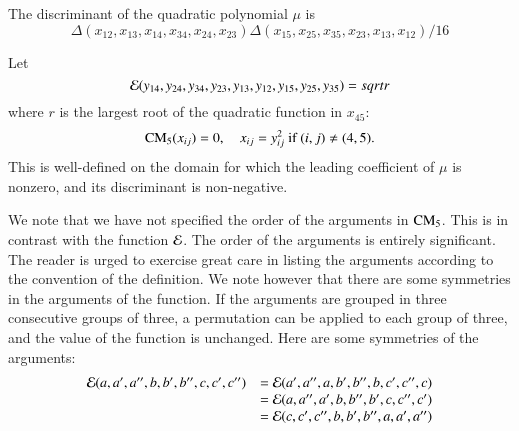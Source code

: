 \begin{tarskidata}
\begin{tarski}
\begin{proved}
\swallowed\end{proved}
\end{tarski}





\begin{tarski}

\begin{lemma}
The discriminant of the quadratic polynomial $\mu$ is
	$$
	\Delta(x_{12}, x_{13}, x_{14}, x_{34}, x_{24}, x_{23}) 
	\Delta(x_{15}, x_{25}, x_{35}, x_{23}, 
          x_{13}, x_{12}) /16
	$$
\end{lemma}

\begin{proved}
\swallowed\end{proved}
\end{tarski}




\begin{tarski}

\begin{definition}[$\CalE$] 
Let 
$${\mathcal E}(y_{14},y_{24},y_{34},y_{23},y_{13},y_{12},y_{15},y_{25},y_{35})=sqrt{r}$$
where $r$ is the largest root of the quadratic function in $x_{45}$:
	$$
	{\operatorname{CM}}_5(x_{ij}) = 0,\quad x_{ij} = y_{ij}^2 \hbox{ if } (i,j)\ne (4,5).
	$$
This is well-defined on the domain for which the leading coefficient of $\mu$ is nonzero, and its
discriminant is non-negative.  
\end{definition}
We note that we have not specified the order of the arguments in ${\operatorname{CM}}_5$.   This is in
contrast with the function $\CalE$.  The order of the arguments is entirely significant.
The reader is urged to exercise great care in listing the arguments according to the
convention of the definition.  We note however that there are some symmetries in the
arguments of the function.  
If the arguments are grouped in three consecutive groups of three, a permutation
can be applied to each group of three, and the value of the function is unchanged.  Here
are some symmetries of the arguments:
	$$
	\begin{array}{lll}
	{\mathcal E}(a,a',a'',b,b',b'',c,c',c'') &= {\mathcal E}(a',a'',a,b',b'',b,c',c'',c)\\
			&={\mathcal E}(a,a'',a',b,b'',b',c,c'',c')\\
			&= {\mathcal E}(c,c',c'',b,b',b'',a,a',a'')\\
	\end{array}
	$$
\end{tarski}



\end{tarskidata}
